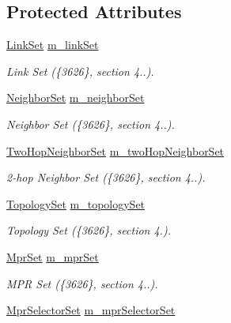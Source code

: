\subsection*{Protected Attributes}
\begin{DoxyCompactItemize}
\item 
\hyperlink{namespacens3_1_1olsr_a60381cc41d65a2e0daabd286077a378a}{Link\+Set} \hyperlink{classns3_1_1olsr_1_1OlsrState_a3f5666e47870dcb7a22077f53ef7b594}{m\+\_\+link\+Set}
\begin{DoxyCompactList}\small\item\em Link Set (\{3626\}, section 4..). \end{DoxyCompactList}\item 
\hyperlink{namespacens3_1_1olsr_af0afef1f28c6f0a0b528b03b638df05d}{Neighbor\+Set} \hyperlink{classns3_1_1olsr_1_1OlsrState_a99512da43a8a58ce2bff71c53ad3da75}{m\+\_\+neighbor\+Set}
\begin{DoxyCompactList}\small\item\em Neighbor Set (\{3626\}, section 4..). \end{DoxyCompactList}\item 
\hyperlink{namespacens3_1_1olsr_a5f9963792af7fea4dc66fb8718394604}{Two\+Hop\+Neighbor\+Set} \hyperlink{classns3_1_1olsr_1_1OlsrState_aa0c379d77bf47a6ded88a4ce20f1fc9d}{m\+\_\+two\+Hop\+Neighbor\+Set}
\begin{DoxyCompactList}\small\item\em 2-\/hop Neighbor Set (\{3626\}, section 4..). \end{DoxyCompactList}\item 
\hyperlink{namespacens3_1_1olsr_aa5a4b5a4c916439ca513b91928d7eba0}{Topology\+Set} \hyperlink{classns3_1_1olsr_1_1OlsrState_aea7e8813993062f693acbef6c0bd96d5}{m\+\_\+topology\+Set}
\begin{DoxyCompactList}\small\item\em Topology Set (\{3626\}, section 4.). \end{DoxyCompactList}\item 
\hyperlink{namespacens3_1_1olsr_aa7c4ede0ba85f0ea9da6e6699525bd4a}{Mpr\+Set} \hyperlink{classns3_1_1olsr_1_1OlsrState_ad037bb15510324de54a208823f567109}{m\+\_\+mpr\+Set}
\begin{DoxyCompactList}\small\item\em M\+PR Set (\{3626\}, section 4..). \end{DoxyCompactList}\item 
\hyperlink{namespacens3_1_1olsr_a320f5a705b7edfac35236d3e28e10e59}{Mpr\+Selector\+Set} \hyperlink{classns3_1_1olsr_1_1OlsrState_ada39f17f601c1fe372ccf1216ffa483f}{m\+\_\+mpr\+Selector\+Set}

\end{DoxyCompactItemize}
